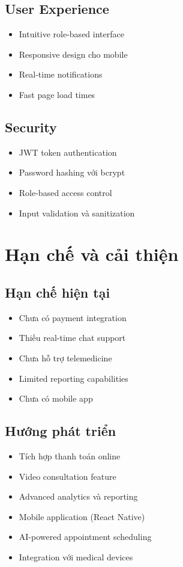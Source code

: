 \documentclass[12pt,a4paper]{report}
\begin{document}
\subsection{User Experience}
\begin{itemize}
    \item Intuitive role-based interface
    \item Responsive design cho mobile
    \item Real-time notifications
    \item Fast page load times
\end{itemize}

\subsection{Security}
\begin{itemize}
    \item JWT token authentication
    \item Password hashing với bcrypt
    \item Role-based access control
    \item Input validation và sanitization
\end{itemize}

\section{Hạn chế và cải thiện}

\subsection{Hạn chế hiện tại}
\begin{itemize}
    \item Chưa có payment integration
    \item Thiếu real-time chat support
    \item Chưa hỗ trợ telemedicine
    \item Limited reporting capabilities
    \item Chưa có mobile app
\end{itemize}

\subsection{Hướng phát triển}
\begin{itemize}
    \item Tích hợp thanh toán online
    \item Video consultation feature
    \item Advanced analytics và reporting
    \item Mobile application (React Native)
    \item AI-powered appointment scheduling
    \item Integration với medical devices
\end{itemize}
\end{document}
